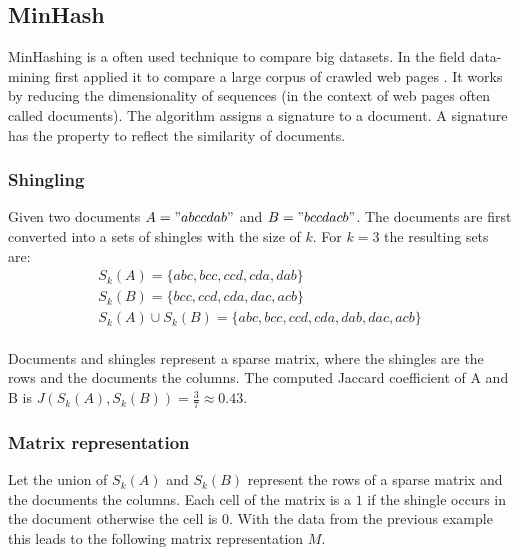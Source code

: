 \subsection{MinHash}
\label{ssec:minhash}

MinHashing is a often used technique to compare big datasets. In the field data-mining \citeauthor{minhash} first applied it to compare a large corpus of crawled web pages \cite{minhash}. It works by reducing the dimensionality of sequences (in the context of web pages often called documents). The algorithm assigns a signature to a document. A signature has the property to reflect the similarity of documents. \\

\subsubsection{Shingling}

Given two documents $ A = "abccdab" $ and $ B = "bccdacb" $. The documents are first converted into a sets of shingles with the size of $ k $. For $ k = 3 $ the resulting sets are: \\

\begin{equation}
    \begin{split}
        S_k(A) = \{abc, bcc, ccd, cda, dab\} \\
        S_k(B) = \{bcc, ccd, cda, dac, acb\} \\
        S_k(A) \cup S_k(B) = \{abc, bcc, ccd, cda, dab, dac, acb\}
    \end{split}
\end{equation}\\

Documents and shingles represent a sparse matrix, where the shingles are the rows and the documents the columns. The computed Jaccard coefficient of A and B is  $ J(S_k(A),S_k(B)) = \frac{3}{7} \approx 0.43 $.\\

\subsubsection{Matrix representation}

Let the union of $ S_k(A) $ and $ S_k(B) $ represent the rows of a sparse matrix and the documents the columns. Each cell of the matrix is a $ 1 $ if the shingle occurs in the document otherwise the cell is $ 0 $. With the data from the previous example this leads to the following matrix representation $ M $.\\

